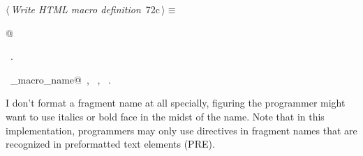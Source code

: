 \documentclass[a4paper]{report}
\begin{document}
\begin{flushleft} \small
\begin{minipage}{\linewidth}\label{scrap142}\raggedright\small
{} $\langle\,${\it Write HTML macro definition}\nobreak\ {\footnotesize {72c}}$\,\rangle\equiv$
\vspace{-1ex}
\begin{list}{}{} \item
\mbox{}@{\NWsep}
\end{list}
\vspace{-1.5ex}
\footnotesize
\begin{list}{}{\setlength{\itemsep}{-\parsep}\setlength{\itemindent}{-\leftmargin}}
\item \NWtxtMacroRefIn\ .
\item \NWtxtIdentsUsed\nobreak\  \verb@collect_macro_name@\nobreak\ , \verb@Name@\nobreak\ , \verb@scraps@\nobreak\ .
\item{}
\end{list}
\end{minipage}\vspace{4ex}
\end{flushleft}
I don't format a fragment name at all specially, figuring the programmer
might want to use italics or bold face in the midst of the name.  Note
that in this implementation, programmers may only use directives in
fragment names that are recognized in preformatted text elements (PRE).
\end{document}
